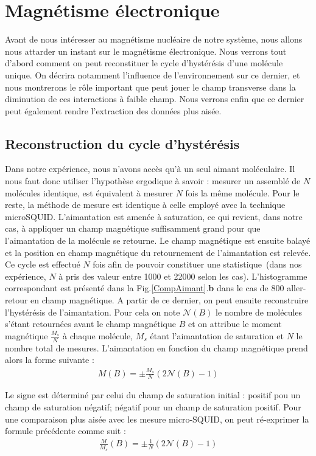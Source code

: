 \section{Magnétisme électronique}
Avant de nous intéresser au magnétisme nucléaire de notre système, nous allons nous attarder un instant sur le magnétisme électronique. Nous verrons tout d'abord comment on peut reconstituer le cycle d'hystérésis d'une molécule unique. On décrira notamment l'influence de l'environnement sur ce dernier, et nous montrerons le rôle important que peut jouer le champ transverse dans la diminution de ces interactions à faible champ. Nous verrons enfin que ce dernier peut également rendre l'extraction des données plus aisée.

\subsection{Reconstruction du cycle d’hystérésis}
Dans notre expérience, nous n'avons accès qu'à un seul aimant moléculaire. Il nous faut donc utiliser l'hypothèse ergodique à savoir : mesurer un assemblé de $N$ molécules identique, est équivalent à mesurer $N$ fois la même molécule. Pour le reste, la méthode de mesure est identique à celle employé avec la technique microSQUID. L'aimantation est amenée à saturation, ce qui revient, dans notre cas, à appliquer un champ magnétique suffisamment grand pour que l'aimantation de la molécule se retourne. Le champ magnétique est ensuite balayé et la position en champ magnétique du retournement de l'aimantation est relevée. Ce cycle est effectué $N$ fois afin de pouvoir constituer une statistique~(dans nos expérience, $N$ à pris des valeur entre 1000 et 22000 selon les cas). L'histogramme correspondant est présenté dans la Fig.\ref{CompAimant}.\textbf{b} dans le cas de 800 aller-retour en champ magnétique. A partir de ce dernier, on peut ensuite reconstruire l'hystérésis de l'aimantation. Pour cela on note $\mathscr{N}(B)$ le nombre de molécules s'étant retournées avant le champ magnétique $B$ et on attribue le moment magnétique $\frac{M_s}{N}$ à chaque molécule, $M_s$ étant l'aimantation de saturation et $N$ le nombre total de mesures. L'aimantation en fonction du champ magnétique prend alors la forme suivante :
\begin{eqnarray}
M(B) =\pm \frac{M_s}{N}(2\mathscr{N}(B) -1)\nonumber
\end{eqnarray}

Le signe est déterminé par celui du champ de saturation initial : positif pou un champ de saturation négatif; négatif pour un champ de saturation positif. Pour une comparaison plus aisée avec les mesure micro-SQUID, on peut ré-exprimer la formule précédente comme suit :
\begin{eqnarray}
\frac{M}{M_s}(B) =\pm \frac{1}{N} (2\mathscr{N}(B) -1)
\end{eqnarray}


